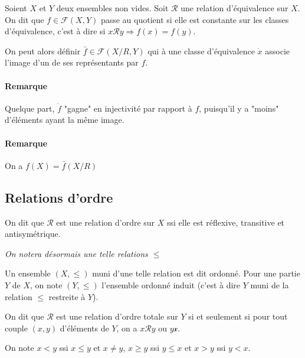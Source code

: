 \documentclass{scrartcl}
\begin{document}
			Soient $X$ et $Y$ deux ensembles non vides. Soit $\mathcal{R}$ une relation d'équivalence sur $X$.
			On dit que $f\in\mathcal{F}(X,Y)$ passe au quotient si elle est constante sur les classes d'équivalence,
			c'est à dire si $x\mathcal{R}y \Rightarrow f(x)=f(y)$.

			On peut alors définir $\bar{f}\in\mathcal{F}(X/R,Y)$ qui à une classe d'équivalence $\dot{x}$ associe
			l'image d'un de ses représentants par $f$.

			\paragraph{Remarque} Quelque part, $\dot{f}$ "gagne" en injectivité par rapport à $f$, puisqu'il y a "moins" d'éléments
			ayant la même image.
			\paragraph{Remarque} On a $f(X) = \bar{f}(X/R)$
		
		\subsection{Relations d'ordre}
			On dit que $\mathcal{R}$ est une relation d'ordre sur $X$ ssi elle est réflexive, transitive et antisymétrique.
			\begin{center}\textsl{On notera désormais une telle relations $\leq$}\end{center}
			Un ensemble $(X,\leq)$ muni d'une telle relation est dit ordonné. Pour une partie $Y$ de $X$,
			on note $(Y,\leq)$ l'ensemble ordonné induit (c'est à dire $Y$ muni de la relation $\leq$ restreite à $Y$).

			On dit que $\mathcal{R}$ est une relation d'ordre totale sur $Y$ si et seulement si pour tout couple
			$(x,y)$ d'éléments de $Y$, on a $x\mathcal{R}y$ ou $y\mathcal{x}$.

			On note $x < y$ ssi $x \leq y$ et $x \neq y$, $x \geq y$ ssi $y \leq x$ et $x > y$ ssi $y < x$.
\end{document}
